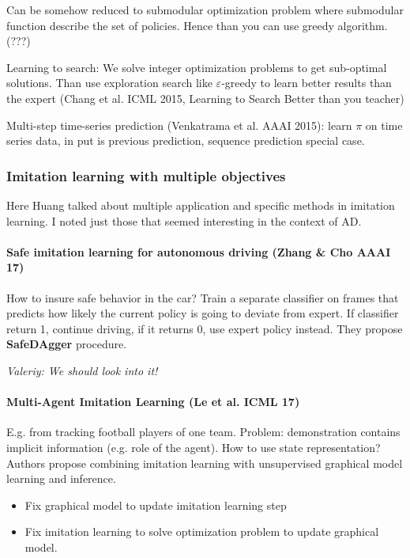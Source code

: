 \documentclass[11pt,oneside,a4paper]{scrartcl}
\newcommand{\valeriy}[1]{{\color{blue}\textit{Valeriy: #1}}}
\begin{document}
Can be somehow reduced to submodular optimization problem where
submodular function describe the set of policies. Hence than you can
use greedy algorithm. (???)

Learning to search: We solve integer optimization problems to get sub-optimal
solutions. Than use exploration search like $\varepsilon$-greedy to learn better
results than the expert (Chang et al. ICML 2015, Learning to Search
Better than you teacher)

Multi-step time-series prediction (Venkatrama et al. AAAI 2015): learn
$\pi$ on time series data, in put is previous prediction, sequence
prediction special case.

\subsubsection{Imitation learning with multiple objectives}
\label{sec:imit-learn-with}

Here Huang talked about multiple application and specific methods in
imitation learning. I noted just those that seemed interesting in the
context of AD.

\paragraph{Safe imitation learning for autonomous driving (Zhang \& Cho AAAI 17)}

How to insure safe behavior in the car? Train a separate classifier
on frames that predicts how likely the current policy is going to
deviate from expert. If classifier return 1, continue driving, if it
returns 0, use expert policy instead. They propose \textbf{SafeDAgger} procedure.

\valeriy{We should look into it!}

\paragraph{Multi-Agent Imitation Learning (Le et al. ICML 17)}

E.g. from tracking football players of one team. Problem:
demonstration contains implicit information (e.g. role of the
agent). How to use state representation? Authors propose combining
imitation learning with unsupervised graphical model learning and
inference.

\begin{itemize}
\item Fix graphical model to update imitation learning step
  
\item Fix imitation learning to solve optimization problem to update
  graphical model.
\end{itemize}
\end{document}

